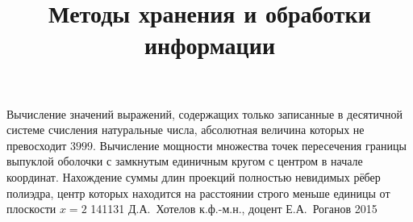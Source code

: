 \documentclass[a4paper,12pt]{memoir}
\begin{document}
\renewcommand{\contentsname}{{\Large{Содержание}\hfill}}

\title{Методы хранения и обработки информации}
{Вычисление значений выражений, содержащих только записанные в 
десятичной системе счисления натуральные числа, абсолютная величина 
которых не превосходит $3999$. Вычисление мощности множества точек 
пересечения границы выпуклой оболочки с замкнутым единичным кругом 
с центром в начале координат. Нахождение суммы длин проекций полностью 
невидимых рёбер полиэдра, центр которых находится на расстоянии строго 
меньше единицы от плоскости $x=2$}
{141131}
{Д.\+А.~Хотелов}
{к.ф.-м.н., доцент}
{Е.\+А.~Роганов}
{2015}






\newpage

\end{document}
